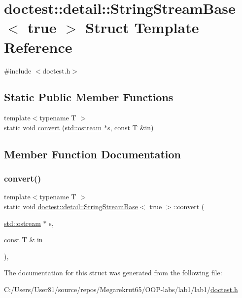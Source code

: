 \hypertarget{structdoctest_1_1detail_1_1_string_stream_base_3_01true_01_4}{}\section{doctest\+:\+:detail\+:\+:String\+Stream\+Base$<$ true $>$ Struct Template Reference}
\label{structdoctest_1_1detail_1_1_string_stream_base_3_01true_01_4}


{\ttfamily \#include $<$doctest.\+h$>$}

\subsection*{Static Public Member Functions}
\begin{DoxyCompactItemize}
\item 
{\footnotesize template$<$typename T $>$ }\\static void \mbox{\hyperlink{structdoctest_1_1detail_1_1_string_stream_base_3_01true_01_4_a3f86285d254474498065e6b70522e2b7}{convert}} (\mbox{\hyperlink{doctest_8h_a116af65cb5e924b33ad9d9ecd7a783f3}{std\+::ostream}} $\ast$s, const T \&in)
\end{DoxyCompactItemize}


\subsection{Member Function Documentation}
\mbox{\label{structdoctest_1_1detail_1_1_string_stream_base_3_01true_01_4_a3f86285d254474498065e6b70522e2b7}} 
\subsubsection{\texorpdfstring{convert()}{convert()}}
{\footnotesize\ttfamily template$<$typename T $>$ \\
static void \mbox{\hyperlink{structdoctest_1_1detail_1_1_string_stream_base}{doctest\+::detail\+::\+String\+Stream\+Base}}$<$ true $>$\+::convert (\begin{DoxyParamCaption}\item[{\mbox{\hyperlink{doctest_8h_a116af65cb5e924b33ad9d9ecd7a783f3}{std\+::ostream}} $\ast$}]{s,  }\item[{const T \&}]{in }\end{DoxyParamCaption})\hspace{0.3cm}{\ttfamily [inline]}, {\ttfamily [static]}}



The documentation for this struct was generated from the following file\+:\begin{DoxyCompactItemize}
\item 
C\+:/\+Users/\+User81/source/repos/\+Megarekrut65/\+O\+O\+P-\/labs/lab1/lab1/\mbox{\hyperlink{doctest_8h}{doctest.\+h}}\end{DoxyCompactItemize}
